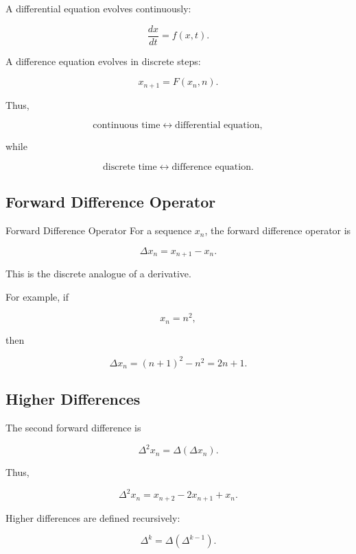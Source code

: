 A differential equation evolves continuously:

\[
\boxed{
\frac{dx}{dt}=f(x,t).
}
\]

A difference equation evolves in discrete steps:

\[
\boxed{
x_{n+1}=F(x_n,n).
}
\]

Thus,

\[
\boxed{
\text{continuous time}
\longleftrightarrow
\text{differential equation},
}
\]

while

\[
\boxed{
\text{discrete time}
\longleftrightarrow
\text{difference equation}.
}
\]

\subsection{Forward Difference Operator}
\label{subsec:forward-difference-operator}

\begin{definitionbox}{Forward Difference Operator}
For a sequence \(x_n\), the forward difference operator is

\[
\boxed{
\Delta x_n
=
x_{n+1}-x_n.
}
\]
\end{definitionbox}

This is the discrete analogue of a derivative.

For example, if

\[
x_n=n^2,
\]

then

\[
\Delta x_n
=
(n+1)^2-n^2
=
2n+1.
\]

\subsection{Higher Differences}
\label{subsec:higher-differences}

The second forward difference is

\[
\boxed{
\Delta^2x_n
=
\Delta(\Delta x_n).
}
\]

Thus,

\[
\Delta^2x_n
=
x_{n+2}
-
2x_{n+1}
+
x_n.
\]

Higher differences are defined recursively:

\[
\boxed{
\Delta^k
=
\Delta(\Delta^{k-1}).
}
\]

